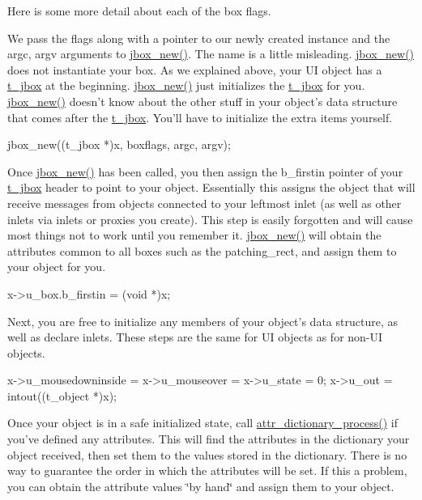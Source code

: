 Here is some more detail about each of the box flags.

We pass the flags along with a pointer to our newly created instance and the argc, argv arguments to \hyperlink{group__jbox_gaaa460d02ca3d22c54368ade59d8e330b}{jbox\_\-new()}. The name is a little misleading. \hyperlink{group__jbox_gaaa460d02ca3d22c54368ade59d8e330b}{jbox\_\-new()} does not instantiate your box. As we explained above, your UI object has a \hyperlink{structt__jbox}{t\_\-jbox} at the beginning. \hyperlink{group__jbox_gaaa460d02ca3d22c54368ade59d8e330b}{jbox\_\-new()} just initializes the \hyperlink{structt__jbox}{t\_\-jbox} for you. \hyperlink{group__jbox_gaaa460d02ca3d22c54368ade59d8e330b}{jbox\_\-new()} doesn't know about the other stuff in your object's data structure that comes after the \hyperlink{structt__jbox}{t\_\-jbox}. You'll have to initialize the extra items yourself.


\begin{DoxyCode}
    jbox_new((t_jbox *)x, boxflags, argc, argv);
\end{DoxyCode}


Once \hyperlink{group__jbox_gaaa460d02ca3d22c54368ade59d8e330b}{jbox\_\-new()} has been called, you then assign the b\_\-firstin pointer of your \hyperlink{structt__jbox}{t\_\-jbox} header to point to your object. Essentially this assigns the object that will receive messages from objects connected to your leftmost inlet (as well as other inlets via inlets or proxies you create). This step is easily forgotten and will cause most things not to work until you remember it. \hyperlink{group__jbox_gaaa460d02ca3d22c54368ade59d8e330b}{jbox\_\-new()} will obtain the attributes common to all boxes such as the patching\_\-rect, and assign them to your object for you.


\begin{DoxyCode}
    x->u_box.b_firstin = (void *)x;
\end{DoxyCode}


Next, you are free to initialize any members of your object's data structure, as well as declare inlets. These steps are the same for UI objects as for non-\/UI objects.


\begin{DoxyCode}
    x->u_mousedowninside = x->u_mouseover = x->u_state = 0;
    x->u_out = intout((t_object *)x);
\end{DoxyCode}


Once your object is in a safe initialized state, call \hyperlink{group__attr_ga3109d643addc97cb6a07785a9170e2e3}{attr\_\-dictionary\_\-process()} if you've defined any attributes. This will find the attributes in the dictionary your object received, then set them to the values stored in the dictionary. There is no way to guarantee the order in which the attributes will be set. If this a problem, you can obtain the attribute values \char`\"{}by hand\char`\"{} and assign them to your object.

